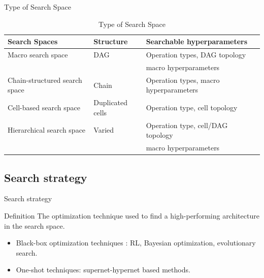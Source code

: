 \documentclass[aspectratio=169,xcolor=dvipsnames]{beamer}
\begin{document}
\begin{frame}{Type of Search Space}
    \small
    \begin{table}[ht]
        \centering
        \begin{tabular}{@{}lll@{}}
            \toprule
            Search Spaces                 & Structure        & Searchable hyperparameters             \\ \midrule
            Macro search space            & DAG              & Operation types, DAG topology          \\
                                          &                  & macro hyperparameters                  \\ \hline
            Chain-structured search space & Chain            & Operation types, macro hyperparameters \\ \hline
            Cell-based search space       & Duplicated cells & Operation type, cell topology          \\ \hline
            Hierarchical search space     & Varied           & Operation type, cell/DAG topology      \\
                                          &                  & macro hyperparameters                  \\ \hline
        \end{tabular}
        \caption{Type of Search Space}
        \label{tab:my_label}
    \end{table}
\end{frame}

\subsection{Search strategy}
\begin{frame}{Search strategy}
    \begin{block}{Definition}
        The optimization technique used to find a high-performing architecture in the search space.
    \end{block}
    \begin{itemize}
        \item Black-box optimization techniques : RL, Bayesian optimization, evolutionary search.
        \item One-shot techniques: supernet-hypernet based methods.
    \end{itemize}
\end{frame}
\end{document}
